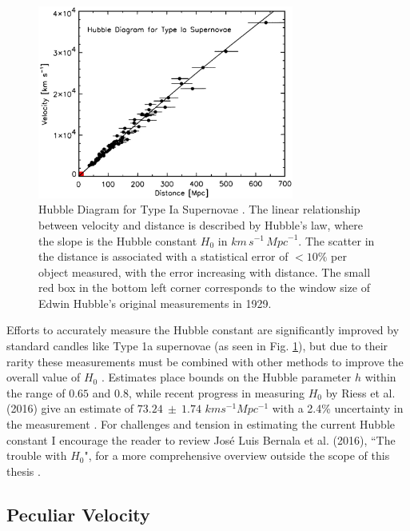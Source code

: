 \begin{figure}[h]
	\centering
	\includegraphics[width=0.75\textwidth]{TypeIa}
	\caption{Hubble Diagram for Type Ia Supernovae  \cite{Kirshner2004:HubbleDiagram}. The linear relationship between velocity and distance is described by Hubble's law, where the slope is the Hubble constant $H_0$ in $km\, s^{-1}\, {Mpc}^{-1}$. The scatter in the distance is associated with a statistical error of $<10\%$ per object measured, with the error increasing with distance. The small red box in the bottom left corner corresponds to the window size of Edwin Hubble's original measurements in 1929.}
	\label{fig:TypeIa}
\end{figure}

Efforts to accurately measure the Hubble constant are significantly improved by standard candles like Type 1a supernovae (as seen in Fig. \ref{fig:TypeIa}), but due to their rarity these measurements must be combined with other methods to improve the overall value of $H_0$ \cite{Narayan2016:SNeIa+Redshift}\cite{Riess2016:H0+2.4}\cite{Kaiser2015:PerturbLumDist+PecVelo}\cite{Reiss2007:SNeIa}.  Estimates place bounds on the Hubble parameter $h$ within the range of $0.65$ and $0.8$, while recent progress in measuring $H_0$ by Riess et al. (2016) give an estimate of $73.24\ \pm\ 1.74$ $km s^{-1} Mpc^{-1}$ with a 2.4\% uncertainty in the measurement \cite{Riess2016:H0+2.4}. For challenges and tension in estimating the current Hubble constant I encourage the reader to review Jos\'e Luis Bernala et al. (2016), ``The trouble with $H_0$", for a more comprehensive overview outside the scope of this thesis \cite{Bernal2016:Trouble+H0}.


\subsection{Peculiar Velocity}

